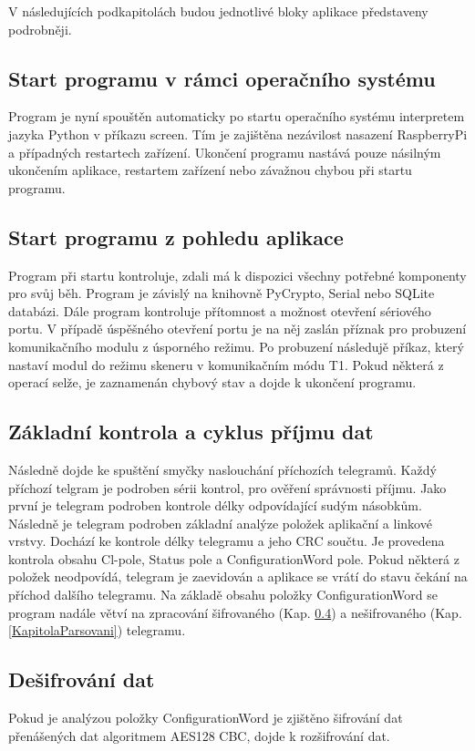 V následujících podkapitolách budou jednotlivé bloky aplikace představeny podrobněji.

\subsection{Start programu v rámci operačního systému}
Program je nyní spouštěn automaticky po startu operačního systému interpretem jazyka Python v příkazu screen. Tím je zajištěna nezávilost nasazení RaspberryPi a případných restartech zařízení. Ukončení programu nastává pouze násilným ukončením aplikace, restartem zařízení nebo závažnou chybou při startu programu. 

\subsection{Start programu z pohledu aplikace}
Program při startu kontroluje, zdali  má k dispozici všechny potřebné komponenty pro svůj běh. Program je závislý na knihovně PyCrypto, Serial nebo SQLite databázi.
Dále program kontroluje přítomnost a možnost otevření sériového portu. V případě úspěšného otevření portu je na něj zaslán příznak pro probuzení komunikačního modulu z úsporného režimu. Po probuzení následujě příkaz, který nastaví modul do režimu skeneru v komunikačním módu T1. Pokud některá z operací selže, je zaznamenán chybový stav a dojde k ukončení programu.

\subsection{Základní kontrola a cyklus příjmu dat}
Následně dojde ke spuštění smyčky naslouchání příchozích telegramů. Každý příchozí telgram je podroben sérii kontrol, pro ověření správnosti příjmu. Jako první je telegram podroben kontrole délky odpovídající sudým násobkům. Následně je telegram podroben základní analýze položek aplikační a linkové vrstvy. Dochází ke kontrole délky telegramu a jeho CRC součtu. Je provedena kontrola obsahu Cl-pole, Status pole a ConfigurationWord pole. Pokud některá z položek neodpovídá, telegram je zaevidován a aplikace se vrátí do stavu čekání na příchod dalšího telegramu.
Na základě obsahu položky ConfigurationWord se program nadále větví na zpracování šifrovaného (Kap. \ref{KapitolaDesifrovani}) a nešifrovaného (Kap. \ref{KapitolaParsovani}) telegramu.

\subsection{Dešifrování dat}
\label{KapitolaDesifrovani}
Pokud je analýzou položky ConfigurationWord je zjištěno šifrování dat přenášených dat algoritmem AES128 CBC, dojde k rozšifrování dat.


